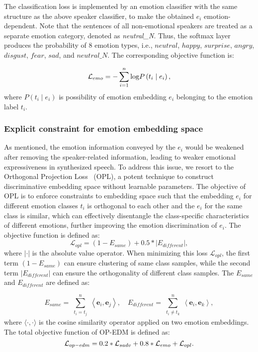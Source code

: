 \documentclass[journal,comsoc]{IEEEtran}
\begin{document}
The classification loss is implemented by an emotion classifier with the same structure as the above speaker classifier, to make the obtained $e_i$ emotion-dependent.
Note that the sentences of all non-emotional speakers are treated as a separate emotion category, denoted as \textit{neutral\_N}.
Thus, the softmax layer produces the probability of $8$ emotion types, i.e., $neutral$, $happy$, $surprise$, $angry$, $disgust$, $fear$, $sad$, and $neutral\_N$. The corresponding objective function is: 

\begin{equation}
    {{\cal L}_{emo}} =  - \sum\limits_{i = 1}^n {\log } P\left( {{t_i}\mid {e_i}} \right),
\end{equation}
where $P( {{t_i}\mid {e_i}})$ is possibility of emotion embedding $e_i$ belonging to the emotion label $t_i$.

\subsubsection{Explicit constraint for emotion embedding space}
As mentioned, the emotion information conveyed by the $e_i$ would be weakened after removing the speaker-related information, leading to weaker emotional expressiveness in synthesized speech. 
To address this issue, we resort to the Orthogonal Projection Loss~\cite{ranasinghe2021orthogonal} (OPL), a potent technique to construct discriminative embedding space without learnable parameters.
The objective of OPL is to enforce constraints to embedding space such that the embedding $e_i$ for different emotion classes $t_i$ is orthogonal to each other and the $e_i$ for the same class is similar, which can effectively disentangle the class-specific characteristics of different emotions, further improving the emotion discrimination of $e_i$. 
The objective function is defined as: 
\begin{equation}
\mathcal{L}_{opl}=(1-E_{same})+0.5 * |E_{different}|,
\end{equation}
where $|\cdot|$ is the absolute value operator. 
When minimizing this loss $\mathcal{L}_{opl}$, the first term $(1-E_{same})$ can ensure clustering of same class samples, while the second term $|E_{different}|$ can ensure the orthogonality of different class samples.
The $E_{same}$ and $E_{different}$ are defined as:

\begin{equation}
E_{same}=\sum_{\substack{t_{i}=t_{j}}}^n\left\langle\mathbf{e}_{i}, \mathbf{e}_{j}\right\rangle, \quad
E_{different}=\sum_{\substack{t_{i} \neq t_{k}}}^n\left\langle\mathbf{e}_{i}, \mathbf{e}_{k}\right\rangle,
\end{equation}
where $\langle\cdot, \cdot\rangle$ is the cosine similarity operator applied on two emotion embeddings. 
The total objective function of OP-EDM is defined as:
\begin{equation}
{{\cal L}_{op-edm}} = 0.2*{{\cal L}_{sadv}} + 0.8*{{\cal L}_{emo}} + {{\cal L}_{opl}}. 
\end{equation}
\end{document}
